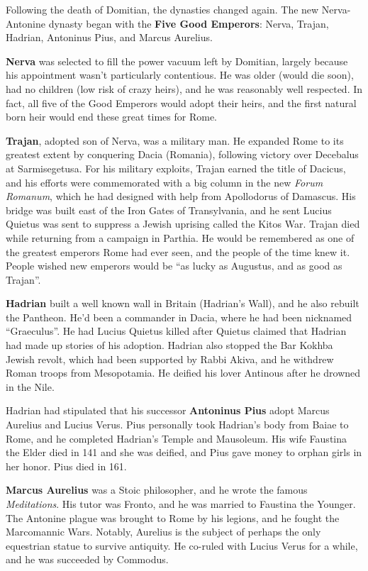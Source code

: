 Following the death of Domitian, the dynasties changed again.
The new Nerva-Antonine dynasty began with the \textbf{Five Good Emperors}:
Nerva, Trajan, Hadrian, Antoninus Pius, and Marcus Aurelius.

\textbf{Nerva} was selected to fill the power vacuum left by Domitian,
largely because his appointment wasn't particularly contentious.
He was older (would die soon), had no children (low risk of crazy heirs), and he was reasonably well respected.
In fact, all five of the Good Emperors would adopt their heirs,
and the first natural born heir would end these great times for Rome.

\textbf{Trajan}, adopted son of Nerva, was a military man.
He expanded Rome to its greatest extent by conquering Dacia (Romania),
following victory over Decebalus at Sarmisegetusa.
For his military exploits, Trajan earned the title of Dacicus,
and his efforts were commemorated with a big column in the new \textit{Forum Romanum},
which he had designed with help from Apollodorus of Damascus.
His bridge was built east of the Iron Gates of Transylvania,
and he sent Lucius Quietus was sent to suppress a Jewish uprising called the Kitos War.
Trajan died while returning from a campaign in Parthia.
He would be remembered as one of the greatest emperors Rome had ever seen,
and the people of the time knew it.
People wished new emperors would be ``as lucky as Augustus, and as good as Trajan''.

\textbf{Hadrian} built a well known wall in Britain (Hadrian's Wall), and he also rebuilt the Pantheon.
He'd been a commander in Dacia, where he had been nicknamed ``Graeculus''.
He had Lucius Quietus killed after Quietus claimed that Hadrian had made up stories of his adoption.
Hadrian also stopped the Bar Kokhba Jewish revolt, which had been supported by Rabbi Akiva,
and he withdrew Roman troops from Mesopotamia.
He deified his lover Antinous after he drowned in the Nile.

Hadrian had stipulated that his successor \textbf{Antoninus Pius} adopt Marcus Aurelius and Lucius Verus.
Pius personally took Hadrian's body from Baiae to Rome, and he completed Hadrian's Temple and Mausoleum.
His wife Faustina the Elder died in 141 and she was deified, and Pius gave money to orphan girls in her honor.
Pius died in 161.

\textbf{Marcus Aurelius} was a Stoic philosopher, and he wrote the famous \textit{Meditations}.
His tutor was Fronto, and he was married to Faustina the Younger.
The Antonine plague was brought to Rome by his legions, and he fought the Marcomannic Wars.
Notably, Aurelius is the subject of perhaps the only equestrian statue to survive antiquity.
He co-ruled with Lucius Verus for a while, and he was succeeded by Commodus.

